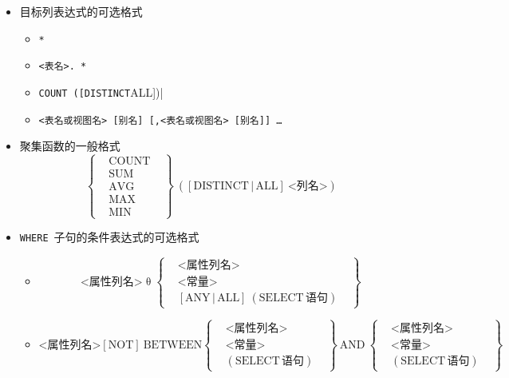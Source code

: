 \begin{itemize}
    \item 目标列表达式的可选格式
    \begin{itemize}
        \item \verb|*|
        \item \verb|<表名>. *|
        \item \verb|COUNT ([DISTINCT|ALL])|
        \item \verb|<表名或视图名> [别名] [,<表名或视图名> [别名]] …|
    \end{itemize}
    \item 聚集函数的一般格式
    $$\left\{
        \begin{aligned}
        & \mathrm{COUNT} \\
        & \mathrm{SUM}\\
        & \mathrm{AVG}\\
        & \mathrm{MAX}\\
        & \mathrm{MIN}
        & \end{aligned}
        \right\} \ ([\mathrm{DISTINCT\,  |\,  ALL}] \ \mbox{<列名>})$$
    \item \verb|WHERE|\ 子句的条件表达式的可选格式
    \begin{itemize}
        \item $$\mbox{<属性列名>} \uptheta\left\{
            \begin{aligned}
            & \mbox{<属性列名>} &\\
            & \mbox{<常量>} \\
            & [\mathrm{ANY} \, |\, \mathrm{ALL}]\ (\mathrm{SELECT}\, \mbox{语句})
            \end{aligned}
            \right\}$$
        \item $$\mbox{<属性列名>} \mathrm{[NOT]\ BETWEEN}\left\{
            \begin{aligned}
            & \mbox{<属性列名>} &\\
            & \mbox{<常量>} \\
            & (\mathrm{SELECT}\, \mbox{语句})
            \end{aligned}
            \right\}
            \ \mathrm{AND}\  \left\{
            \begin{aligned}
            & \mbox{<属性列名>} &\\
            & \mbox{<常量>} \\
            & (\mathrm{SELECT}\, \mbox{语句})
            \end{aligned}
            \right\}$$

\end{itemize}
\end{itemize}
